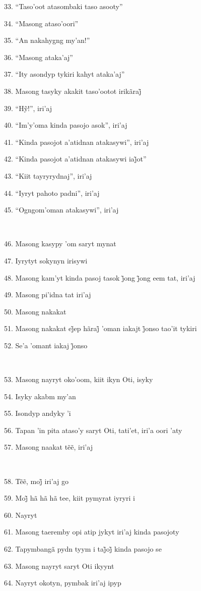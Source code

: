 33. ``Taso'oot atasombaki taso asooty''

34. ``Masong ataso'oori''

35. ``An nakahygng my'an!''

36. ``Masong ataka'aj''

37. ``Ity asondyp tykiri kahyt ataka'aj''

38. Masong tasyky akakit taso’ootot irikãraj̃

39. ``Hỹ!'', iri’aj

40. ``Im'y'oma kinda pasojo asok'', iri'aj

41. ``Kinda pasojot a'atidnan atakasywi'', iri'aj

42. ``Kinda pasojot a’atidnan atakasywi iaj̃ot''

43. ``Kiit tayryrydnaj'', iri'aj

44. ``Iyryt pahoto padni'', iri'aj

45. ``Ogngom'oman atakasywi'', iri'aj

~

46. Masong kasypy 'om saryt mynat

47. Iyrytyt sokynyn irisywi

48. Masong kam’yt kinda pasoj tasok j̃ong j̃ong eem tat, iri’aj

49. Masong pi'idna tat iri'aj

50. Masong nakakat

51. Masong nakakat ej̃ep hãraj̃ ’oman iakajt j̃onso tao’it tykiri

52. Se’a ’omant iakaj j̃onso

~

53. Masong nayryt oko'oom, kiit ikyn Oti, isyky

54. Isyky akabm my'an

55. Isondyp andyky 'i

56. Tapan 'in pita ataso'y saryt Oti, tati'et, iri'a oori 'aty

57. Masong naakat tẽẽ, iri’aj

~

58. Tẽẽ, moj̃ iri’aj go

59. Moj̃ hã hã hã tee, kiit pymyrat iyryri i

60. Nayryt

61. Masong taeremby opi atip jykyt iri'aj kinda pasojoty

62. Tapymbangã pydn tyym i taj̃oj̃ kinda pasojo se

63. Masong nayryt saryt Oti ikyynt

64. Nayryt okotyn, pymbak iri'aj ipyp

